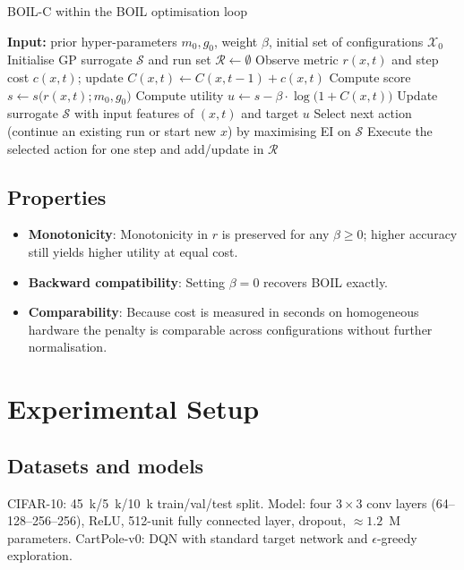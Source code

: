 \documentclass{article} %
\begin{document}
\begin{algorithm}
\caption{BOIL-C within the BOIL optimisation loop}
\begin{algorithmic}[1]
  \State \textbf{Input:} prior hyper-parameters \(m_0,g_0\), weight \(\beta\), initial set of configurations \(\mathcal{X}_0\)
  \State Initialise GP surrogate \(\mathcal{S}\) and run set \(\mathcal{R}\leftarrow\emptyset\)
      \State Observe metric \(r(x,t)\) and step cost \(c(x,t)\); update \(C(x,t)\leftarrow C(x,t-1)+c(x,t)\)
      \State Compute score \(s\leftarrow s\big(r(x,t); m_0,g_0\big)\)
      \State Compute utility \(u\leftarrow s - \beta\cdot \log\big(1+C(x,t)\big)\)
      \State Update surrogate \(\mathcal{S}\) with input features of \((x,t)\) and target \(u\)
    \EndFor
    \State Select next action (continue an existing run or start new \(x\)) by maximising EI on \(\mathcal{S}\)
    \State Execute the selected action for one step and add/update in \(\mathcal{R}\)
  \EndWhile
\end{algorithmic}
\end{algorithm}

\subsection{Properties}
\begin{itemize}
  \item \textbf{Monotonicity}: Monotonicity in \(r\) is preserved for any \(\beta\ge 0\); higher accuracy still yields higher utility at equal cost.
  \item \textbf{Backward compatibility}: Setting \(\beta=0\) recovers BOIL exactly.
  \item \textbf{Comparability}: Because cost is measured in seconds on homogeneous hardware the penalty is comparable across configurations without further normalisation.
\end{itemize}

\section{Experimental Setup}\label{sec:experimental}%
\subsection{Datasets and models}
CIFAR-10: 45~k/5~k/10~k train/val/test split. Model: four \(3\times 3\) conv layers (64--128--256--256), ReLU, 512-unit fully connected layer, dropout, \(\approx 1.2\)~M parameters. CartPole-v0: DQN with standard target network and \(\epsilon\)-greedy exploration.
\end{document}

